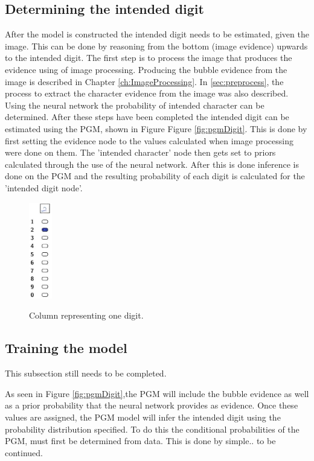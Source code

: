 \subsection{Determining the intended digit}
After the model is constructed the intended digit needs to be estimated, given the image. This can be done by reasoning from the bottom (image evidence) upwards to the intended digit. The first step is to process the image that produces the evidence using of image processing. Producing the bubble evidence from the image is described in Chapter \ref{ch:ImageProcessing}. In \ref{sec:preprocess}, the process to extract the character evidence from the image was also described. Using the neural network the probability of intended character can be determined. After these steps have been completed the intended digit can be estimated using the PGM, shown in Figure Figure \ref{fig:pgmDigit}. This is done by first setting the evidence node to the values calculated when image processing were done on them. The 'intended character' node then gets set to priors calculated through the use of the neural network. After this is done inference is done on the PGM and the resulting probability of each digit is calculated for the 'intended digit node'.

\begin{figure}
  \centering
  \includegraphics[width=1cm]{column}\\
  \caption{Column representing one digit.}
  \label{fig:column}
\end{figure}

\subsection{Training the model}

This subsection still needs to be completed.

As seen in Figure \ref{fig:pgmDigit},the PGM will include the bubble evidence as well as a prior probability that the neural network provides as evidence. Once these values are assigned, the PGM model will infer the intended digit using the probability distribution specified. To do this the conditional probabilities of the PGM, must first be determined from data. This is done by simple.. to be continued.


